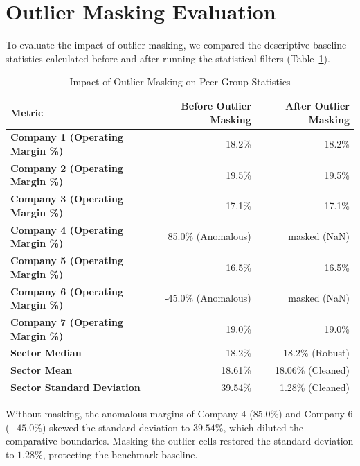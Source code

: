\section{Outlier Masking Evaluation}
To evaluate the impact of outlier masking, we compared the descriptive baseline statistics calculated before and after running the statistical filters (Table~\ref{tab:outlier_impact}).

\begin{table}[htbp]
    \centering
    \small
    \setlength{\tabcolsep}{4pt}
    \caption{Impact of Outlier Masking on Peer Group Statistics}
    \label{tab:outlier_impact}
    \begin{tabular}{>{\bfseries}lrr}
        \toprule
        \textbf{Metric} & \textbf{Before Outlier Masking} & \textbf{After Outlier Masking} \\
        \midrule
        Company 1 (Operating Margin \%) & 18.2\% & 18.2\% \\
        Company 2 (Operating Margin \%) & 19.5\% & 19.5\% \\
        Company 3 (Operating Margin \%) & 17.1\% & 17.1\% \\
        Company 4 (Operating Margin \%) & 85.0\% (Anomalous) & masked (NaN) \\
        Company 5 (Operating Margin \%) & 16.5\% & 16.5\% \\
        Company 6 (Operating Margin \%) & -45.0\% (Anomalous) & masked (NaN) \\
        Company 7 (Operating Margin \%) & 19.0\% & 19.0\% \\
        \midrule
        Sector Median & 18.2\% & 18.2\% (Robust) \\
        Sector Mean & 18.61\% & 18.06\% (Cleaned) \\
        Sector Standard Deviation & 39.54\% & 1.28\% (Cleaned) \\
        \bottomrule
    \end{tabular}
\end{table}

Without masking, the anomalous margins of Company 4 ($85.0\%$) and Company 6 ($-45.0\%$) skewed the standard deviation to $39.54\%$, which diluted the comparative boundaries. Masking the outlier cells restored the standard deviation to $1.28\%$, protecting the benchmark baseline.

